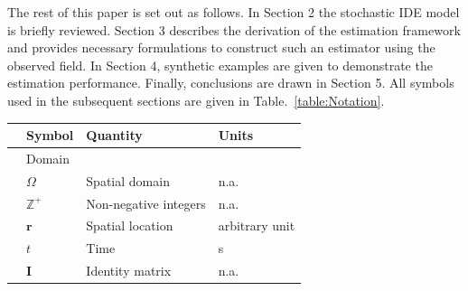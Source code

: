 \documentclass[10pt,twocolumn,twoside]{IEEEtran}
\begin{document}
The rest of this paper is set out as follows. In Section 2 the stochastic IDE model is briefly reviewed. Section 3 describes the derivation of the estimation framework and provides necessary formulations to construct such an estimator using the observed field. In Section 4, synthetic examples are given to demonstrate the estimation performance. Finally, conclusions are drawn in Section 5. All symbols used in the subsequent sections are given in Table.~\ref{table:Notation}. 
\begin {table}[t]
\begin{center}
	{\tiny\begin{tabular}{llll}
	\hline \hline
	& Symbol & Quantity & Units\\ 
	\hline 
	& Domain&& \\
	& $\Omega$ &Spatial domain& n.a. \\ 
	& $\mathbb{Z}^{+}$ &Non-negative integers& n.a. \\ 
	& $\mathbf{r}$ &Spatial location& arbitrary unit\\ 
	& $t$ &Time & s \\  
	& $\mathbf I$ & Identity matrix & n.a. \\ 


\end{tabular}}
\end{center}
\end{table}
\end{document}
